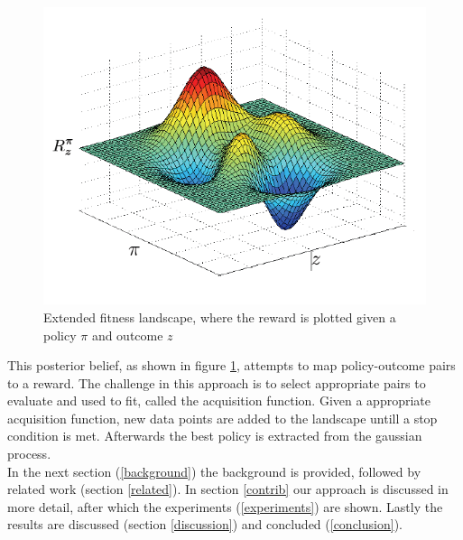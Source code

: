 \begin{figure}[ht]
  \centering
  \includegraphics[scale=0.5]{images/fitness-landscape.png}
  \caption{Extended fitness landscape, where the reward is plotted given a policy $\pi$ and outcome $z$}\label{fitnesslandscape}
\end{figure}

This posterior belief, as shown in figure \ref{fitnesslandscape}, attempts to map policy-outcome pairs to a reward. The challenge in this approach is to select appropriate pairs to evaluate and used to fit, called the acquisition function. Given a appropriate acquisition function, new data points are added to the landscape untill a stop condition is met. Afterwards the best policy is extracted from the gaussian process. \\

In the next section (\ref{background}) the background is provided, followed by related work (section \ref{related}). In section \ref{contrib} our approach is discussed in more detail, after which the experiments (\ref{experiments}) are shown. Lastly the results are discussed (section \ref{discussion}) and concluded (\ref{conclusion}).



